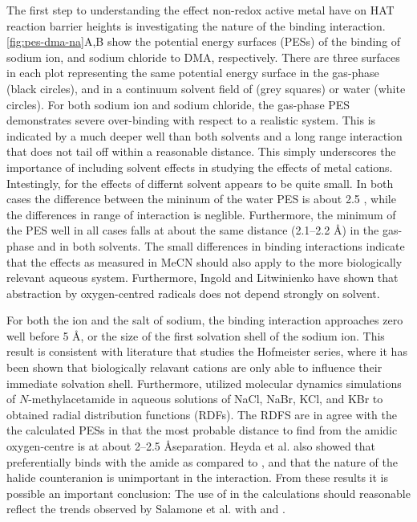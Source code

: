 The first step to understanding the effect non-redox active metal have on HAT reaction barrier heights is investigating the nature of the binding interaction. \ref{fig:pes-dma-na}A,B show the potential energy surfaces (PESs) of the binding of sodium ion, and sodium chloride to DMA, respectively. There are three surfaces in each plot representing the same potential energy surface in the gas-phase (black circles), and in a continuum solvent field of (grey squares) or water (white circles). For both sodium ion and sodium chloride, the gas-phase PES demonstrates severe over-binding with respect to a realistic system. This is indicated by a much deeper well than both solvents and a long range interaction that does not tail off within a reasonable distance. This simply underscores the importance of including solvent effects in studying the effects of metal cations. Intestingly, for the effects of differnt solvent appears to be quite small. In both cases the difference between the mininum of the water PES is about 2.5 \kcalmol, while the differences in range of interaction is neglible. Furthermore, the minimum of the PES well in all cases falls at about the same distance (2.1--2.2 \AA) in the gas-phase and in both solvents. The small differences in binding interactions indicate that the effects as measured in MeCN should also apply to the more biologically relevant aqueous system. Furthermore, Ingold and Litwinienko have shown that  abstraction by oxygen-centred radicals does not depend strongly on solvent.\cite{Litwinienko2007}

For both the ion and the salt of sodium, the binding interaction approaches zero well before 5 \AA, or the size of the first solvation shell of the sodium ion.\cite{Degreve1996} This result is consistent with literature that studies the Hofmeister series, where it has been shown that biologically relavant cations are only able to influence their immediate solvation shell.\cite{Omta2003, Funkner2011} Furthermore, \citet{Heyda2009} utilized molecular dynamics simulations of $N$-methylacetamide in aqueous solutions of NaCl, NaBr, KCl, and KBr to obtained radial distribution functions (RDFs). The RDFS are in agree with the the calculated PESs in that the most probable distance to find  from the amidic oxygen-centre is at about 2--2.5 \AA separation. Heyda et al. also showed that  preferentially binds with the amide as compared to , and that the nature of the halide counteranion is unimportant in the interaction. From these results it is possible an important conclusion: The use of  in the calculations should reasonable reflect the trends observed by Salamone et al. with  and .

